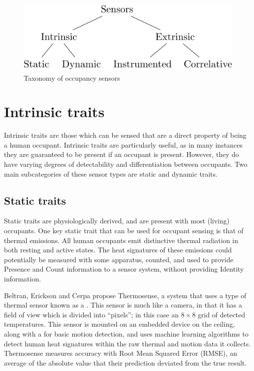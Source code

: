 \documentclass[../thesis/thesis.tex]{subfiles}
\begin{document}
\begin{figure}
\centering
\includegraphics{../diagrams/category-tree.pdf}
\caption{Taxonomy of occupancy sensors}
\label{fig:litreview:taxonomy}
\end{figure}

\section{Intrinsic traits}
\label{subsec:litreview:sensors:intrinsic}

Intrinsic traits are those which can be sensed that are a direct property of being a human occupant. Intrinsic traits are particularly useful, as in many instances they are guaranteed to be present if an occupant is present. However, they do have varying degrees of detectability and differentiation between occupants. Two main subcategories of these sensor types are static and dynamic traits.

\subsection{Static traits}
\label{subsubsec:litreview:sensors:intrinsic:static}
Static traits are physiologically derived, and are present with most (living) occupants. One key static trait that can be used for occupant sensing is that of thermal emissions. All human occupants emit distinctive thermal radiation in both resting and active states. The heat signatures of these emissions could potentially be measured with some apparatus, counted, and used to provide Presence and Count information to a sensor system, without providing Identity information.

Beltran, Erickson and Cerpa \cite{beltran2013thermosense} propose Thermosense, a system that uses a type of thermal sensor known as a \iar. This sensor is much like a camera, in that it has a field of view which is divided into ``pixels''; in this case an $8\times8$ grid of detected temperatures. This sensor is mounted on an embedded device on the ceiling, along with a \pir for basic motion detection, and uses machine learning algorithms to detect human heat signatures within the raw thermal and motion data it collects. Thermosense measures accuracy with Root Mean Squared Error (RMSE), an average of the absolute value that their prediction deviated from the true result.
\end{document}
